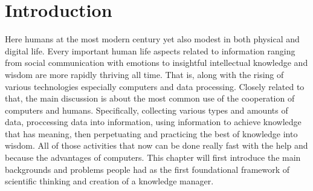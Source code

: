 \chapter{Introduction}
\label{chap:introduction}

Here humans at the most modern century yet also modest in both physical and digital life.
Every important human life aspects related to information ranging from social communication with emotions to insightful intellectual knowledge and wisdom are more rapidly thriving all time.
That is, along with the rising of various technologies especially computers and data processing.
Closely related to that, the main discussion is about the most common use of the cooperation of computers and humans.
Specifically, collecting various types and amounts of data, proccessing data into information, using information to achieve knowledge that has meaning, then perpetuating and practicing the best of knowledge into wisdom.
All of those activities that now can be done really fast with the help and because the advantages of computers.
This chapter will first introduce the main backgrounds and problems people had as the first foundational framework of scientific thinking and creation of a knowledge manager.
